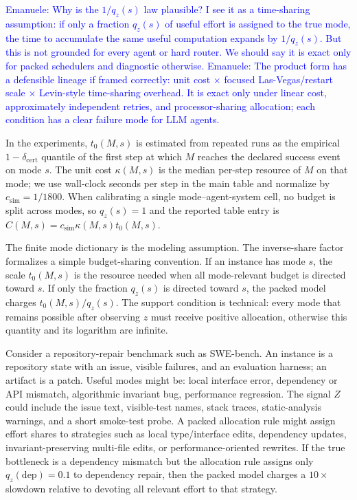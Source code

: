 \documentclass{article}
\newcounter{algorithm}
\begin{document}
\textcolor{blue}{Emanuele: Why is the \(1/q_z(s)\) law plausible? I see it as a time-sharing assumption: if only a fraction \(q_z(s)\) of useful effort is assigned to the true mode, the time to accumulate the same useful computation expands by \(1/q_z(s)\). But this is not grounded for every agent or hard router. We should say it is exact only for packed schedulers and diagnostic otherwise.}
\textcolor{blue}{Emanuele: The product form has a defensible lineage if framed correctly: unit cost \(\times\) focused Las-Vegas/restart scale \(\times\) Levin-style time-sharing overhead. It is exact only under linear cost, approximately independent retries, and processor-sharing allocation; each condition has a clear failure mode for LLM agents.}

In the experiments, \(t_0(M,s)\) is estimated from repeated runs as the empirical \(1-\delta_{\mathrm{cert}}\) quantile of the first step at which \(M\) reaches the declared success event on mode \(s\).
The unit cost \(\kappa(M,s)\) is the median per-step resource of \(M\) on that mode; we use wall-clock seconds per step in the main table and normalize by \(c_{\mathrm{sim}}=1/1800\).
When calibrating a single mode--agent-system cell, no budget is split across modes, so \(q_z(s)=1\) and the reported table entry is \(C(M,s)=c_{\mathrm{sim}}\kappa(M,s)t_0(M,s)\).

The finite mode dictionary is the modeling assumption.  The inverse-share factor formalizes
a simple budget-sharing convention.  If an instance has mode \(s\), the scale \(t_0(M,s)\)
is the resource needed when all mode-relevant budget is directed toward \(s\).  If only the
fraction \(q_z(s)\) is directed toward \(s\), the packed model charges \(t_0(M,s)/q_z(s)\).
The support condition is technical: every mode that remains possible after observing \(z\)
must receive positive allocation, otherwise this quantity and its logarithm are infinite.

Consider a repository-repair benchmark such as SWE-bench.  An instance is a repository
state with an issue, visible failures, and an evaluation harness; an artifact is a patch.
Useful modes might be: local interface error, dependency or API mismatch, algorithmic invariant bug, performance regression.
The signal \(Z\) could include the issue text, visible-test names, stack traces, static-analysis
warnings, and a short smoke-test probe.  A packed allocation rule might assign effort shares to
strategies such as local type/interface edits, dependency updates, invariant-preserving
multi-file edits, or performance-oriented rewrites.  If the true bottleneck is a dependency
mismatch but the allocation rule assigns only \(q_z(\mathrm{dep})=0.1\) to dependency repair,
then the packed model charges a \(10\times\) slowdown relative to devoting all relevant
effort to that strategy.
\end{document}
